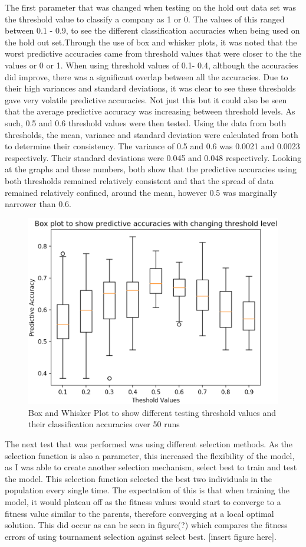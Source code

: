 \documentclass[11pt]{article}
\begin{document}
The first parameter that was changed when testing on the hold out data set was the threshold value to classify a company as 1 or 0. The values of this ranged between 0.1 - 0.9, to see the different classification accuracies when being used on the hold out set.Through the use of box and whisker plots, it was noted that the worst predictive accuracies came from threshold values that were closer to the the values or 0 or 1. When using threshold values of 0.1- 0.4, although the accuracies did improve, there was a significant overlap between all the accuracies. Due to their high variances and standard deviations, it was clear to see these thresholds gave very volatile predictive accuracies. Not just this but it could also be seen that the average predictive accuracy was increasing between threshold levels. As such, 0.5 and 0.6 threshold values were then tested. Using the data from both thresholds, the mean, variance and standard deviation were calculated from both to determine their consistency. The variance of 0.5 and 0.6 was 0.0021 and 0.0023 respectively. Their standard deviations were 0.045 and 0.048 respectively. Looking at the graphs and these numbers, both show that the predictive accuracies using both thresholds remained relatively consistent and that the spread of data remained relatively confined, around the mean, however 0.5 was marginally narrower than 0.6. 
\begin{figure}[h]
\centering
\includegraphics[scale = .40]{thresh}
\caption{Box and Whisker Plot to show different testing threshold values and their classification accuracies over 50 runs} 
\end{figure}
The next test that was performed was using different selection methods. As the selection function is also a parameter, this increased the flexibility of the model, as I was able to create another selection mechanism, select best to train and test the model. This selection function selected the best two individuals in the population every single time. The expectation of this is that when training the model, it would plateau off as the fitness values would start to converge to a fitness value similar to the parents, therefore converging at a local optimal solution. This did occur as can be seen in figure(?) which compares the fitness errors of using tournament selection against select best. [insert figure here].
\end{document}
